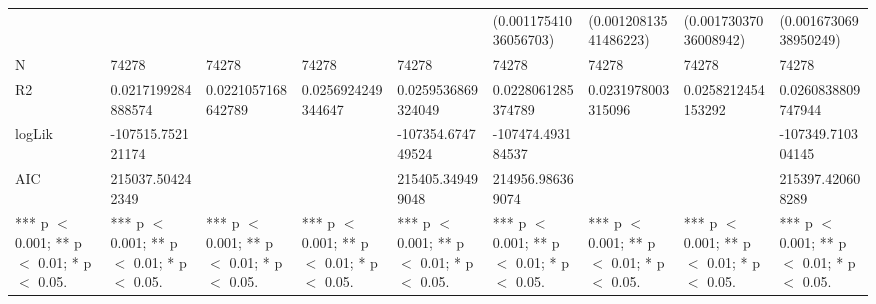\begin{table}[ht]
\begin{tabular}{lllllllll}
   &  &  &  &  & (0.00117541036056703) & (0.00120813541486223) & (0.00173037036008942) & (0.00167306938950249) \\ 
  N & 74278 & 74278 & 74278 & 74278 & 74278 & 74278 & 74278 & 74278 \\ 
  R2 & 0.0217199284888574 & 0.0221057168642789 & 0.0256924249344647 & 0.0259536869324049 & 0.0228061285374789 & 0.0231978003315096 & 0.0258212454153292 & 0.0260838809747944 \\ 
  logLik & -107515.752121174 &  &  & -107354.674749524 & -107474.493184537 &  &  & -107349.710304145 \\ 
  AIC & 215037.504242349 &  &  & 215405.349499048 & 214956.986369074 &  &  & 215397.420608289 \\ 
   *** p $<$ 0.001;  ** p $<$ 0.01;  * p $<$ 0.05. &  *** p $<$ 0.001;  ** p $<$ 0.01;  * p $<$ 0.05. &  *** p $<$ 0.001;  ** p $<$ 0.01;  * p $<$ 0.05. &  *** p $<$ 0.001;  ** p $<$ 0.01;  * p $<$ 0.05. &  *** p $<$ 0.001;  ** p $<$ 0.01;  * p $<$ 0.05. &  *** p $<$ 0.001;  ** p $<$ 0.01;  * p $<$ 0.05. &  *** p $<$ 0.001;  ** p $<$ 0.01;  * p $<$ 0.05. &  *** p $<$ 0.001;  ** p $<$ 0.01;  * p $<$ 0.05. &  *** p $<$ 0.001;  ** p $<$ 0.01;  * p $<$ 0.05. \\ 
   \hline
\end{tabular}
\end{table}
